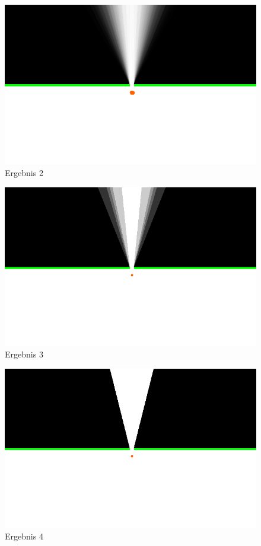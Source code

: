 \documentclass[10pt,twocolumn]{scrartcl}
\begin{document}
\begin{figure}[t]
	\centering
	\includegraphics[width=\columnwidth]{images/ergebnis.png}
	\caption{Ergebnis 2}
	\label{fig:ergeb2}
\end{figure}

\begin{figure}[t]
	\centering
	\includegraphics[width=\columnwidth]{images/ergebnis_2.png}
	\caption{Ergebnis 3}
	\label{fig:ergeb3}
\end{figure}

\begin{figure}[t]
	\centering
	\includegraphics[width=\columnwidth]{images/ergebnis_3.png}
	\caption{Ergebnis 4}
	\label{fig:ergeb4}
\end{figure}
\end{document}
